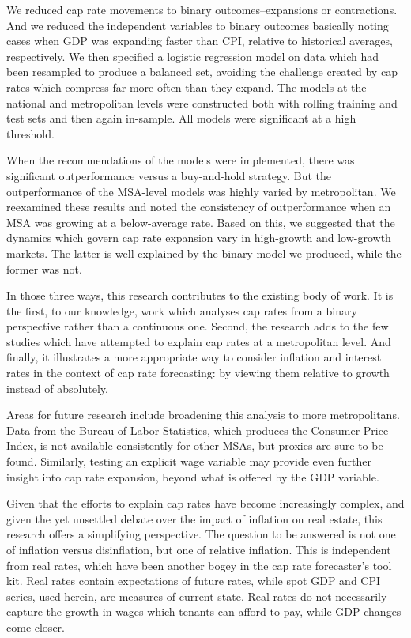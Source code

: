 \documentclass[jrfm,article,submit,oneauthor,pdftex]{Definitions/mdpi}
\begin{document}
We reduced cap rate movements to binary outcomes--expansions or contractions. And we reduced the independent variables to binary outcomes basically noting cases when GDP was expanding faster than CPI, relative to historical averages, respectively. We then specified a logistic regression model on data which had been resampled to produce a balanced set, avoiding the challenge created by cap rates which compress far more often than they expand. The models at the national and metropolitan levels were constructed both with rolling training and test sets and then again in-sample. All models were significant at a high threshold. 

When the recommendations of the models were implemented, there was significant outperformance versus a buy-and-hold strategy. But the outperformance of the MSA-level models was highly varied by metropolitan. We reexamined these results and noted the consistency of outperformance when an MSA was growing at a below-average rate. Based on this, we suggested that the dynamics which govern cap rate expansion vary in high-growth and low-growth markets. The latter is well explained by the binary model we produced, while the former was not. 

In those three ways, this research contributes to the existing body of work. It is the first, to our knowledge, work which analyses cap rates from a binary perspective rather than a continuous one. Second, the research adds to the few studies which have attempted to explain cap rates at a metropolitan level. And finally, it illustrates a more appropriate way to consider inflation and interest rates in the context of cap rate forecasting: by viewing them relative to growth instead of absolutely.

Areas for future research include broadening this analysis to more metropolitans. Data from the Bureau of Labor Statistics, which produces the Consumer Price Index, is not available consistently for other MSAs, but proxies are sure to be found. Similarly, testing an explicit wage variable may provide even further insight into cap rate expansion, beyond what is offered by the GDP variable. 

Given that the efforts to explain cap rates have become increasingly complex, and given the yet unsettled debate over the impact of inflation on real estate, this research offers a simplifying perspective. The question to be answered is not one of inflation versus disinflation, but one of relative inflation. This is independent from real rates, which have been another bogey in the cap rate forecaster's tool kit. Real rates contain expectations of future rates, while spot GDP and CPI series, used herein, are measures of current state. Real rates do not necessarily capture the growth in wages which tenants can afford to pay, while GDP changes come closer. 
\end{document}
